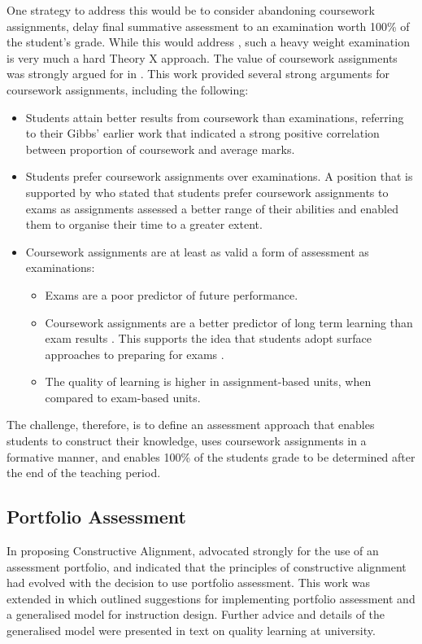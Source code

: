 One strategy to address this would be to consider abandoning coursework assignments, delay final summative assessment to an examination worth 100\% of the student's grade. While this would address , such a heavy weight examination is very much a hard Theory X approach. The value of coursework assignments was strongly argued for in \citet{Gibbs:2004}. This work provided several strong arguments for coursework assignments, including the following:
\begin{itemize}[noitemsep,nolistsep]
	\item Students attain better results from coursework than examinations, referring to their Gibbs' earlier work that indicated a strong positive correlation between proportion of coursework and average marks.
	\item Students prefer coursework assignments over examinations. A position that is supported by \citet{Kniveton:1996} who stated that students prefer coursework assignments to exams as assignments assessed a better range of their abilities and enabled them to organise their time to a greater extent.
	\item Coursework assignments are at least as valid a form of assessment as examinations:
	\begin{itemize}
		\item Exams are a poor predictor of future performance.
		\item Coursework assignments are a better predictor of long term learning than exam results \cite{Conway:1992}. This supports the idea that students adopt surface approaches to preparing for exams \citet{Marton:1976a}. 
		\item The quality of learning is higher in assignment-based units, when compared to exam-based units.
	\end{itemize}
\end{itemize}

The challenge, therefore, is to define an assessment approach that enables students to construct their knowledge, uses coursework assignments in a formative manner, and enables 100\% of the students grade to be determined after the end of the teaching period.

\subsection{Portfolio Assessment} %
\label{sub:portfolio_assessment}

In proposing Constructive Alignment, \citet{Biggs:1996c} advocated strongly for the use of an assessment portfolio, and indicated that the principles of constructive alignment had evolved with the decision to use portfolio assessment. This work was extended in \cite{Biggs:1997} which outlined suggestions for implementing portfolio assessment and a generalised model for instruction design. Further advice and details of the generalised model were presented in \citet{Biggs:2007} text on quality learning at university.

